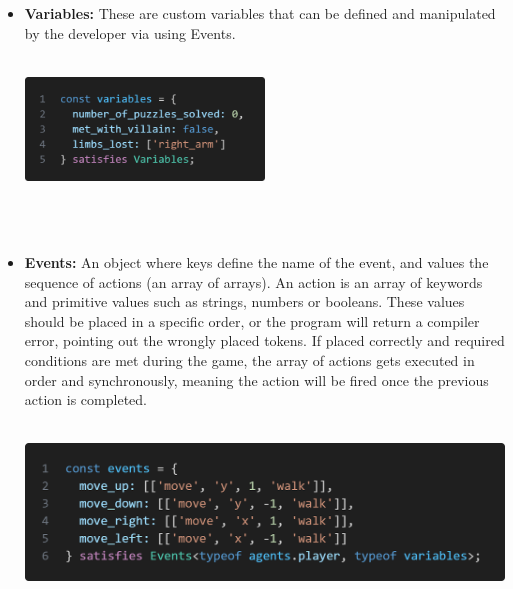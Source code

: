 \documentclass{article}
\begin{document}
\begin{itemize}
    \item \textbf{Variables:} These are custom variables that can be defined and manipulated by the developer via using Events.\\\\ 
    \begin{minipage}{\linewidth}
        \centering
        \includegraphics[width=0.5\textwidth]{variables.png}
    \end{minipage}\\\\
    
    \item \textbf{Events:} An object where keys define the name of the event, and values the sequence of actions (an array of arrays). An action is an array of keywords and primitive values such as strings, numbers or booleans. These values should be placed in a specific order, or the program will return a compiler error, pointing out the wrongly placed tokens. If placed correctly and required conditions are met during the game, the array of actions gets executed in order and synchronously, meaning the action will be fired once the previous action is completed.\\\\ 
        \begin{minipage}{\linewidth}
        \centering
        \includegraphics[width=1\textwidth]{events.png}
    \end{minipage}\\\\
    

\end{itemize}
\end{document}

